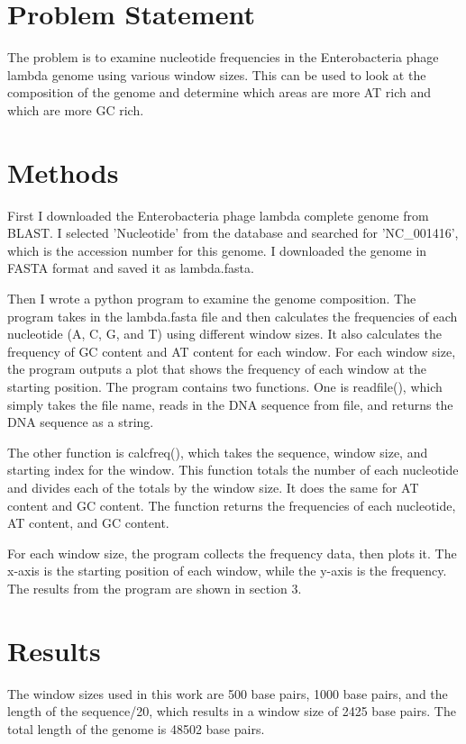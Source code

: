 \documentclass{acm_proc_article-sp}
\begin{document}
\section{Problem Statement}
The problem is to examine nucleotide frequencies in the Enterobacteria phage lambda genome using various window sizes.  This can be used to look at the composition of the genome and determine which areas are more AT rich and which are more GC rich.  
\section{Methods}
First I downloaded the Enterobacteria phage lambda complete genome from BLAST.  I selected 'Nucleotide' from the database and searched for 'NC\_001416', which is the accession number for this genome.  I downloaded the genome in FASTA format and saved it as lambda.fasta.

Then I wrote a python program to examine the genome composition. The program takes in the lambda.fasta file and then calculates the frequencies of each nucleotide (A, C, G, and T) using different window sizes.  It also calculates the frequency of GC content and AT content for each window.  For each window size, the program outputs a plot that shows the frequency of each window at the starting position.  The program contains two functions.  One is readfile(), which simply takes the file name, reads in the DNA sequence from file, and returns the DNA sequence as a string.  

The other function is calcfreq(), which takes the sequence, window size, and starting index for the window.  This function totals the number of each nucleotide and divides each of the totals by the window size.  It does the same for AT content and GC content.  The function returns the frequencies of each nucleotide, AT content, and GC content.

For each window size, the program collects the frequency data, then plots it.  The x-axis is the starting position of each window, while the y-axis is the frequency.  The results from the program are shown in section 3. 

\section{Results}
The window sizes used in this work are 500 base pairs, 1000 base pairs, and the length of the sequence/20, which results in a window size of 2425 base pairs.  The total length of the genome is 48502 base pairs.
\end{document}

